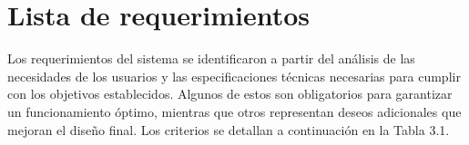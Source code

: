 \documentclass[12pt,a4paper,oneside]{report}
\begin{document}
\section{Lista de requerimientos}\label{lista-de-requerimientos}

Los requerimientos del sistema se identificaron a partir del análisis de las necesidades de los usuarios y las especificaciones técnicas necesarias para cumplir con los objetivos establecidos. Algunos de estos son obligatorios para garantizar un funcionamiento óptimo, mientras que otros representan deseos adicionales que mejoran el diseño final. Los criterios se detallan a continuación en la Tabla 3.1.

\label{tbl:3.1}
\end{document}
